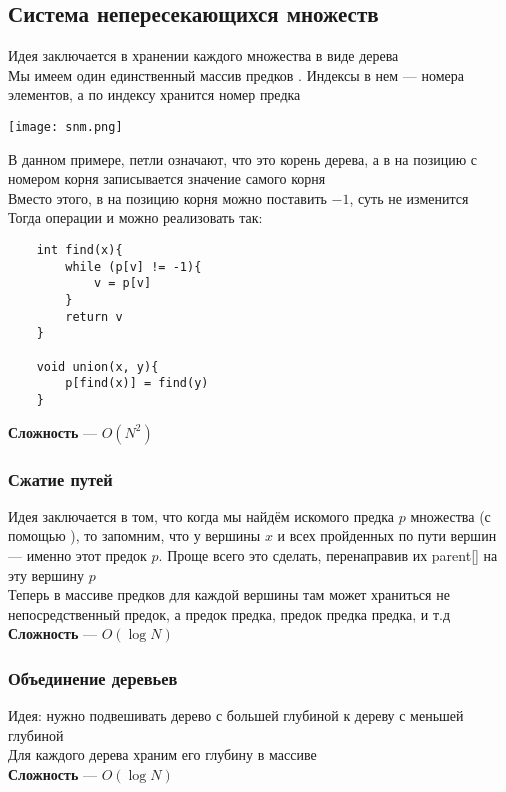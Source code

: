 \documentclass[a4paper]{article}
\begin{document}
\subsection{Система непересекающихся множеств}
Идея заключается в хранении каждого множества в виде дерева\\[2mm]
\indent Мы имеем один единственный массив предков . Индексы в нем — номера элементов, а по индексу хранится номер предка
\begin{center}
    \texttt{[image: snm.png]}
    \label{dsu}
\end{center}
В данном примере, петли означают, что это корень дерева, а в  на позицию с номером корня записывается значение самого корня\\[2mm]
Вместо этого, в  на позицию корня можно поставить $-1$, суть не изменится\\[2mm]
Тогда операции  и  можно реализовать так:
\begin{lstlisting}
    int find(x){
        while (p[v] != -1){
            v = p[v]
        }
        return v
    }
    
    void union(x, y){
        p[find(x)] = find(y)
    }
\end{lstlisting}
\indent\textbf{Сложность} — $O(N^2)$
\subsubsection{Сжатие путей}
Идея заключается в том, что когда мы найдём искомого предка $p$ множества (с помощью ), то запомним, что у вершины $x$ и всех пройденных по пути вершин — именно этот предок $p$. Проще всего это сделать, перенаправив их {\rm parent}[] на эту вершину $p$\\[2mm]
\indent Теперь в массиве предков для каждой вершины там может храниться не непосредственный предок, а предок предка, предок предка предка, и т.д\\[2mm]
\indent \textbf{Сложность} — $O(\log N)$

\subsubsection{Объединение деревьев}
Идея: нужно подвешивать дерево с большей глубиной к дереву с меньшей глубиной\\[2mm]
\indent Для каждого дерева храним его глубину в массиве\\[2mm]
\indent \textbf{Сложность} — $O(\log N)$
\end{document}
